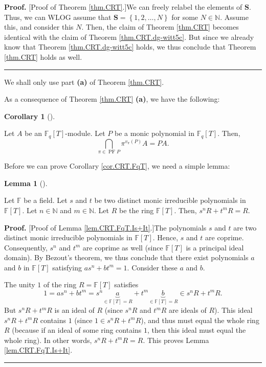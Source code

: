 \documentclass[numbers=enddot,12pt,final,onecolumn,notitlepage]{scrartcl}%
\theoremstyle{definition}
\newtheorem{lem}[theo]{Lemma}
\newenvironment{lemma}[1][]
{\begin{lem}[#1]\begin{leftbar}}
{\end{leftbar}\end{lem}}
\newtheorem{coro}[theo]{Corollary}
\newenvironment{corollary}[1][]
{\begin{coro}[#1]\begin{leftbar}}
{\end{leftbar}\end{coro}}
\newenvironment{proof}[1][Proof]{\noindent\textbf{#1.} }{\ \rule{0.5em}{0.5em}}
\begin{document}
\begin{proof}
[Proof of Theorem \ref{thm.CRT}.]We can freely relabel the elements of
$\mathbf{S}$. Thus, we can WLOG assume that $\mathbf{S}=\left\{
1,2,\ldots,N\right\}  $ for some $N\in\mathbb{N}$. Assume this, and consider
this $N$. Then, the claim of Theorem \ref{thm.CRT} becomes identical with the
claim of Theorem \ref{thm.CRT.dg-witt5c}. But since we already know that
Theorem \ref{thm.CRT.dg-witt5c} holds, we thus conclude that Theorem
\ref{thm.CRT} holds as well.
\end{proof}

We shall only use part \textbf{(a)} of Theorem \ref{thm.CRT}.

As a consequence of Theorem \ref{thm.CRT} \textbf{(a)}, we have the following:

\begin{corollary}
\label{cor.CRT.FqT}Let $A$ be an $\mathbb{F}_{q}\left[  T\right]  $-module.
Let $P$ be a monic polynomial in $\mathbb{F}_{q}\left[  T\right]  $. Then,
\[
\bigcap_{\pi\in\operatorname*{PF}P}\pi^{v_{\pi}\left(  P\right)  }A=PA.
\]

\end{corollary}

Before we can prove Corollary \ref{cor.CRT.FqT}, we need a simple lemma:

\begin{lemma}
\label{lem.CRT.FqT.Is+It}Let $\mathbb{F}$ be a field. Let $s$ and $t$ be two
distinct monic irreducible polynomials in $\mathbb{F}\left[  T\right]  $. Let
$n\in\mathbb{N}$ and $m\in\mathbb{N}$. Let $R$ be the ring $\mathbb{F}\left[
T\right]  $. Then, $s^{n}R+t^{m}R=R$.
\end{lemma}

\begin{proof}
[Proof of Lemma \ref{lem.CRT.FqT.Is+It}.]The polynomials $s$ and $t$ are two
distinct monic irreducible polynomials in $\mathbb{F}\left[  T\right]  $.
Hence, $s$ and $t$ are coprime. Consequently, $s^{n}$ and $t^{m}$ are coprime
as well (since $\mathbb{F}\left[  T\right]  $ is a principal ideal domain). By
Bezout's theorem, we thus conclude that there exist polynomials $a$ and $b$ in
$\mathbb{F}\left[  T\right]  $ satisfying $as^{n}+bt^{m}=1$. Consider these
$a$ and $b$.

The unity $1$ of the ring $R=\mathbb{F}\left[  T\right]  $ satisfies
\[
1=as^{n}+bt^{m}=s^{n}\underbrace{a}_{\in\mathbb{F}\left[  T\right]  =R}%
+t^{m}\underbrace{b}_{\in\mathbb{F}\left[  T\right]  =R}\in s^{n}R+t^{m}R.
\]
But $s^{n}R+t^{m}R$ is an ideal of $R$ (since $s^{n}R$ and $t^{m}R$ are ideals
of $R$). This ideal $s^{n}R+t^{m}R$ contains $1$ (since $1\in s^{n}R+t^{m}R$),
and thus must equal the whole ring $R$ (because if an ideal of some ring
contains $1$, then this ideal must equal the whole ring). In other words,
$s^{n}R+t^{m}R=R$. This proves Lemma \ref{lem.CRT.FqT.Is+It}.
\end{proof}
\end{document}
